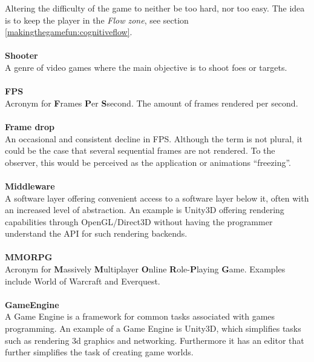 Altering the difficulty of the game to neither be too hard, nor too easy.
The idea is to keep the player in the \textit{Flow zone}, see section \ref{makingthegamefun:cognitiveflow}.\\
\\
\textbf{Shooter}\vspace{4pt}\\
A genre of video games where the main objective is to shoot foes or targets. \cite{oxShooter}\\
\\
\textbf{FPS}\vspace{4pt}\\
Acronym for \textbf{F}rames \textbf{P}er \textbf{S}second.
The amount of frames rendered per second.\\
\\
\textbf{Frame drop}\vspace{4pt}\\
An occasional and consistent decline in FPS. Although the term is not plural, it could be the case that several sequential frames are not rendered.
To the observer, this would be perceived as the application or animations ``freezing''.\\
\\
\textbf{Middleware}\vspace{4pt}\\
A software layer offering convenient access to a software layer below it, often with an increased level of abstraction.
An example is Unity3D offering rendering capabilities through OpenGL/Direct3D without having the programmer understand the API for such rendering backends.\\
\\
\textbf{MMORPG}\vspace{4pt}\\
Acronym for \textbf{M}assively \textbf{M}ultiplayer \textbf{O}nline \textbf{R}ole-\textbf{P}laying \textbf{G}ame.
Examples include World of Warcraft and Everquest.\\
\\
\textbf{GameEngine}\vspace{4pt}\\
A Game Engine is a framework for common tasks associated with games programming.
An example of a Game Engine is Unity3D, which simplifies tasks such as rendering 3d graphics and networking.
Furthermore it has an editor that further simplifies the task of creating game worlds\cite{unityGameEngine}.\\
\\
